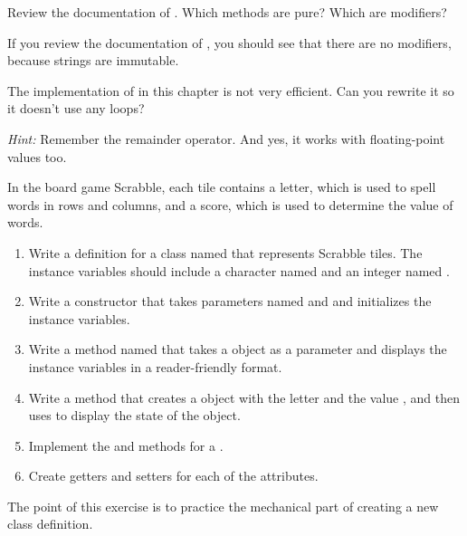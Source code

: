 \begin{exercise}  %

  
Review the documentation of .
Which methods are pure?
Which are modifiers?

If you review the documentation of , you should see that there are no modifiers, because strings are immutable.

\end{exercise}


\begin{exercise}  %

The implementation of  in this chapter is not very efficient.
Can you rewrite it so it doesn't use any loops?

{\it Hint:} Remember the remainder operator. And yes, it works with floating-point values too.

\end{exercise}


\begin{exercise}  %

In the board game Scrabble, each tile contains a letter, which is used to spell words in rows and columns, and a score, which is used to determine the value of words.

\begin{enumerate}

\item Write a definition for a class named  that represents Scrabble tiles.
The instance variables should include a character named  and an integer named .

\item Write a constructor that takes parameters named  and  and initializes the instance variables.

\item Write a method named  that takes a  object as a parameter and displays the instance variables in a reader-friendly format.

\item Write a  method that creates a  object with the letter  and the value , and then uses  to display the state of the object.

\item Implement the  and  methods for a .

\item Create getters and setters for each of the attributes.

\end{enumerate}

The point of this exercise is to practice the mechanical part of creating a new class definition.
\end{exercise}



